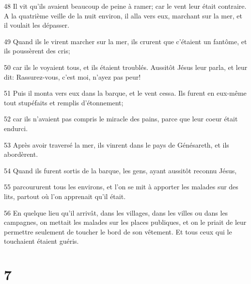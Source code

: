 \par 48 Il vit qu'ils avaient beaucoup de peine à ramer; car le vent leur était contraire. A la quatrième veille de la nuit environ, il alla vers eux, marchant sur la mer, et il voulait les dépasser.
\par 49 Quand ils le virent marcher sur la mer, ils crurent que c'étaient un fantôme, et ils poussèrent des cris;
\par 50 car ils le voyaient tous, et ils étaient troublés. Aussitôt Jésus leur parla, et leur dit: Rassurez-vous, c'est moi, n'ayez pas peur!
\par 51 Puis il monta vers eux dans la barque, et le vent cessa. Ils furent en eux-même tout stupéfaits et remplis d'étonnement;
\par 52 car ils n'avaient pas compris le miracle des pains, parce que leur coeur était endurci.
\par 53 Après avoir traversé la mer, ils vinrent dans le pays de Génésareth, et ils abordèrent.
\par 54 Quand ils furent sortis de la barque, les gens, ayant aussitôt reconnu Jésus,
\par 55 parcoururent tous les environs, et l'on se mit à apporter les malades sur des lits, partout où l'on apprenait qu'il était.
\par 56 En quelque lieu qu'il arrivât, dans les villages, dans les villes ou dans les campagnes, on mettait les malades sur les places publiques, et on le priait de leur permettre seulement de toucher le bord de son vêtement. Et tous ceux qui le touchaient étaient guéris.

\chapter{7}

